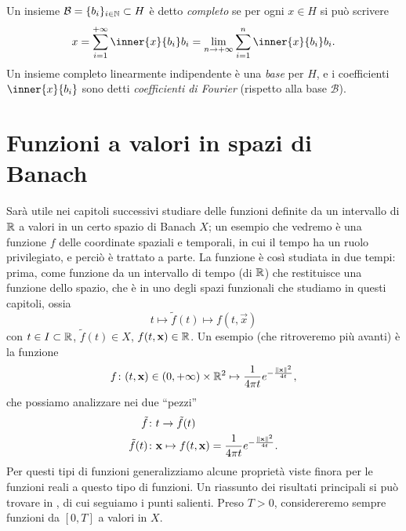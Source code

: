 \begin{definizione} \label{d:insieme-completo}
    Un insieme $\mathcal{B}=\{b_i\}_{i\in\mathbb{N}}\subset H$ è detto \emph{completo} se per ogni $x\in H$ si può scrivere
    \begin{equation}
        x=\sum_{i=1}^{+\infty}\inner{x}{b_i}b_i=\lim_{n\to+\infty}\sum_{i=1}^n\inner{x}{b_i}b_i.
    \end{equation}
    Un insieme completo linearmente indipendente è una \emph{base} per $H$, e i coefficienti $\inner{x}{b_i}$ sono detti \emph{coefficienti di Fourier} (rispetto alla base $\mathcal{B}$).
\end{definizione}

\section{Funzioni a valori in spazi di Banach}
Sarà utile nei capitoli successivi studiare delle funzioni definite da un intervallo di $\mathbb{R}$ a valori in un certo spazio di Banach $X$; un esempio che vedremo è una funzione $f$ delle coordinate spaziali e temporali, in cui il tempo ha un ruolo privilegiato, e perciò è trattato a parte.
La funzione è cos\`i studiata in due tempi: prima, come funzione da un intervallo di tempo (di $\mathbb{R}$) che restituisce una funzione dello spazio, che è in uno degli spazi funzionali che studiamo in questi capitoli, ossia
\begin{equation}
    t\mapsto \tilde{f}(t)\mapsto f(t,\vec x)
\end{equation}
con $t\in I\subset\mathbb{R}$, $\tilde{f}(t)\in X$, $f(t,\mathbf{x})\in\mathbb{R}$.
Un esempio (che ritroveremo più avanti) è la funzione
\begin{equation}
    f\colon(t,\mathbf{x})\in(0,+\infty)\times\mathbb{R}^2\mapsto\frac1{4\pi t}e^{-\frac{\lVert\mathbf{x}\rVert^2}{4t}},
\end{equation}
che possiamo analizzare nei due ``pezzi''
\begin{equation}
    \begin{aligned}
        \tilde{f}&\colon t\to\tilde{f}(t)\\
        \tilde{f}(t)&\colon\mathbf{x}\mapsto f(t,\mathbf{x})=\frac1{4\pi t}e^{-\frac{\lVert\mathbf{x}\rVert^2}{4t}}.
    \end{aligned}
\end{equation}
Per questi tipi di funzioni generalizziamo alcune proprietà viste finora per le funzioni reali a questo tipo di funzioni.
Un riassunto dei risultati principali si può trovare in \cite[cap.~6A]{pde:hunter}, di cui seguiamo i punti salienti.
Preso $T>0$, considereremo sempre funzioni da $[0,T]$ a valori in $X$.

